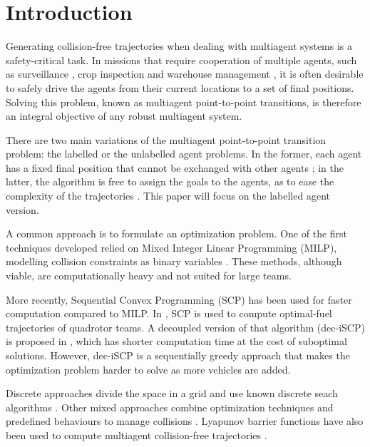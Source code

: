 \section{Introduction}
\label{sec:introduction}
Generating collision-free trajectories when dealing with multiagent systems is a safety-critical task. In missions that require cooperation of multiple agents, such as surveillance \cite{vallejo2009multi}, crop inspection \cite{carbone2018swarm} and warehouse management \cite{guizzo2008three}, it is often desirable to safely drive the agents from their current locations to a set of final positions. Solving this problem, known as multiagent point-to-point transitions, is therefore an integral objective of any robust multiagent system.

There are two main variations of the multiagent point-to-point transition problem: the labelled or the unlabelled agent problems. In the former, each agent has a fixed final position that cannot be exchanged with other agents \cite{schouwenaars2001mixed, augugliaro2012generation}; in the latter, the algorithm is free to assign the goals to the agents, as to ease the complexity of the trajectories \cite{turpin2012decentralized}. This paper will focus on the labelled agent version. 

A common approach is to formulate an optimization problem. One of the first techniques developed relied on Mixed Integer Linear Programming (MILP), modelling collision constraints as binary variables \cite{schouwenaars2001mixed}. These methods, although viable, are computationally heavy and not suited for large teams.

More recently, Sequential Convex Programming (SCP) \cite{boyd2008sequential} has been used for faster computation compared to MILP. In \cite{augugliaro2012generation}, SCP is used to compute optimal-fuel trajectories of quadrotor teams. A decoupled version of that algorithm (dec-iSCP) is proposed in \cite{chen2015decoupled}, which has shorter computation time at the cost of suboptimal solutions. However, dec-iSCP is a sequentially greedy approach that makes the optimization problem harder to solve as more vehicles are added.

Discrete approaches divide the space in a grid and use known discrete seach algorithms \cite{preiss}. Other mixed approaches combine optimization techniques and predefined behaviours to manage collisions \cite{tang2018complete}. Lyapunov barrier functions have also been used to compute multiagent collision-free trajectories \cite{wang2017safety}.

